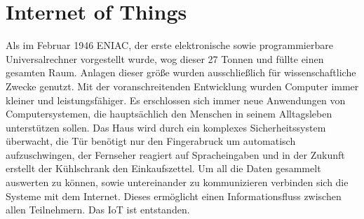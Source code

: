 \chapter{Internet of Things}\label{c:IoT}

Als im Februar 1946 ENIAC, der erste elektronische sowie programmierbare Universalrechner vorgestellt wurde, wog dieser 27 Tonnen und füllte einen gesamten Raum. Anlagen dieser größe wurden ausschließlich für wissenschaftliche Zwecke genutzt.
Mit der voranschreitenden Entwicklung wurden Computer immer kleiner und leistungsfähiger. Es erschlossen sich immer neue Anwendungen von Computersystemen, die hauptsächlich den Menschen in seinem Alltagsleben unterstützen sollen.
Das Haus wird durch ein komplexes Sicherheitssystem überwacht, die Tür benötigt nur den Fingerabruck um automatisch aufzuschwingen, der Fernseher reagiert auf Spracheingaben und in der Zukunft erstellt der Kühlschrank den Einkaufszettel.
Um all die Daten gesammelt auswerten zu können, sowie untereinander zu kommunizieren verbinden sich die Systeme mit dem Internet. Dieses ermöglicht einen Informationsfluss zwischen allen Teilnehmern. 
Das IoT ist entstanden.

